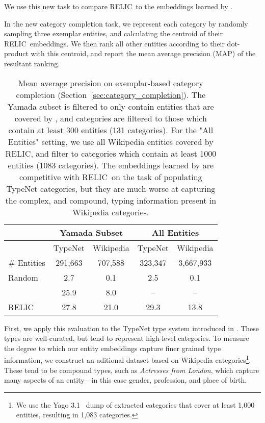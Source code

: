 \documentclass{article} \usepackage{iclr2020_conference,times}
\newcommand{\ack}{RELIC\xspace}
\begin{document}
We use this new task to compare \ack~to the embeddings learned by \citealt{yamada-etal-2017-learning}.

In the new category completion task, we represent each category by randomly sampling three exemplar entities, and calculating the centroid of their \ack~embeddings.
We then rank all other entities according to their dot-product with this centroid, and report the mean average precision (MAP) of the resultant ranking.


\begin{table}[]
    \centering
    \begin{tabular}{|l||c|c||c|c|}
    \hline
    & \multicolumn{2}{c||}{Yamada Subset} & \multicolumn{2}{c|}{All Entities} \\ \hline
    & TypeNet & Wikipedia & TypeNet & Wikipedia \\ \hline
    \# Entities & 291,663 & 707,588 & 323,347 & 3,667,933 \\ \hline
    Random & 2.7 & 0.1 & 2.5 & 0.1 \\
    \citealt{yamada-etal-2017-learning} & 25.9 & 8.0 & -- & -- \\
    \ack & 27.8 & 21.0 & 29.3 & 13.8 \\ \hline
\end{tabular}
    \caption{Mean average precision on exemplar-based category completion (Section~\ref{sec:category_completion}).
    The Yamada subset is filtered to only contain entities that are covered by \citealt{yamada-etal-2017-learning}, and categories are filtered to those
    which contain at least 300 entities (131 categories).
    For the "All Entities" setting, we use all Wikipedia entities covered by \ack, and filter to categories which contain at least 1000 entities (1083 categories).
    The embeddings learned by \citealt{yamada-etal-2017-learning} are competitive with \ack~on the task of populating TypeNet categories, but they are much worse at capturing the complex, and compound, typing information present in Wikipedia categories.}
    \label{tab:category_completion}
\end{table}


First, we apply this evaluation to the TypeNet type system introduced in \citep{murty2018hierarchical}.
These types are well-curated, but tend to represent high-level categories.
To measure the degree to which our entity embeddings capture finer grained type information, we construct an aditional dataset based on Wikipedia categories\footnote{We use the Yago 3.1~\citep{mahdisoltani2013yago3} dump of extracted categories that cover at least 1,000 entities, resulting in 1,083 categories.}.
These tend to be compound types, such as {\it Actresses from London}, which capture many aspects of an entity---in this case gender, profession, and place of birth.
\end{document}
